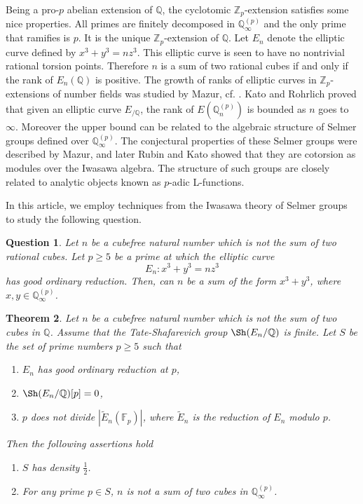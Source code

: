 \documentclass[11pt]{amsart}
\newtheorem{theorem}{Theorem}[section]
\newtheorem{question}[theorem]{Question}
\newcommand{\Z}{\mathbb{Z}}
\newcommand{\Q}{\mathbb{Q}}
\newcommand{\F}{\mathbb{F}}
\numberwithin{equation}{section}
\begin{document}
\par Being a pro-$p$ abelian extension of $\Q$,  the cyclotomic $\Z_p$-extension satisfies some nice properties.  All primes are finitely decomposed in $\Q_\infty^{(p)}$ and the only prime that ramifies is $p$.  It is the unique $\Z_p$-extension of $\Q$.  Let $E_n$ denote the elliptic curve defined by $x^3+y^3=n z^3$.  This elliptic curve is seen to have no nontrivial rational torsion points. Therefore $n$ is a sum of two rational cubes if and only if the rank of $E_n(\Q)$ is positive.  The growth of ranks of elliptic curves in $\Z_p$-extensions of number fields was studied by Mazur, cf. \cite{mazur1972rational}.  Kato \cite{kato2004p} and Rohrlich \cite{rohrlich} proved that given an elliptic curve $E_{/\Q}$,  the rank of $E(\Q_n^{(p)})$ is bounded as $n$ goes to $\infty$.  Moreover the upper bound can be related to the algebraic structure of Selmer groups defined over $\Q_\infty^{(p)}$.  The conjectural properties of these Selmer groups were described by Mazur,  and later Rubin \cite{rubinbsd} and Kato \cite{kato2004p} showed that they are cotorsion as modules over the Iwasawa algebra. The structure of such groups are closely related to analytic objects known as $p$-adic L-functions.  

\par In this article,  we employ techniques from the Iwasawa theory of Selmer groups to study the following question.
\begin{question}
Let $n$ be a cubefree natural number which is not the sum of two rational cubes.  Let $p\geq 5$ be a prime at which the elliptic curve 
\[E_n: x^3+y^3=n z^3\] has good ordinary reduction. Then,  can $n$ be a sum of the form $x^3+y^3$, where $x,y\in \Q_\infty^{(p)}$. 
\end{question}

\begin{theorem}\label{main thm}
    Let $n$ be a cubefree natural number which is not the sum of two cubes in $\Q$. Assume that the Tate-Shafarevich group $\Sh(E_n/\Q)$ is finite.  Let $S$ be the set of prime numbers $p\geq 5$ such that 
\begin{enumerate}[label=(\alph*)]
\item $E_n$ has good ordinary reduction at $p$,
\item $\Sh(E_n/\Q)[p]=0$,
\item $p$ does not divide $|\widetilde{E}_n(\F_p)|$, where $\widetilde{E}_n$ is the reduction of $E_n$ modulo $p$. 
\end{enumerate}Then the following assertions hold
\begin{enumerate}
    \item $S$ has density $ \frac{1}{2}$.
    \item For any prime $p\in S$,  $n$ is not a sum of two cubes in $\Q_\infty^{(p)}$.
\end{enumerate}
\end{theorem}
\end{document}
